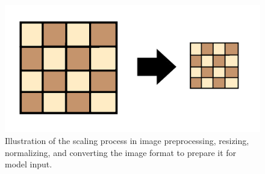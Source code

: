 \begin{figure}[h!]
    \centering
    \includegraphics[width=0.75\linewidth]{figures/theory/image-recognition/scaling.png}
    \caption[Scaling process in image preprocessing]{Illustration of the scaling process in image preprocessing, resizing, normalizing, and converting the image format to prepare it for model input. \cite{thepythoncode:nms}}
    \label{fig:nms}
\end{figure}

